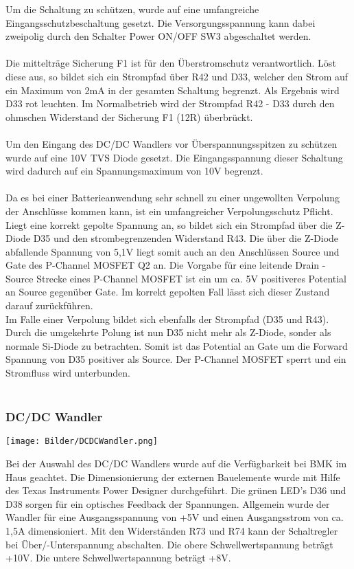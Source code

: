\documentclass[a4paper,11pt]{scrartcl}
\begin{document}
Um die Schaltung zu schützen, wurde auf eine umfangreiche Eingangsschutzbeschaltung gesetzt. Die Versorgungsspannung kann dabei zweipolig durch den Schalter \glqq Power ON/OFF SW3 \grqq{} abgeschaltet werden.
\\
\\
Die mittelträge Sicherung F1 ist für den Überstromschutz verantwortlich. Löst diese aus, so bildet sich ein Strompfad über R42 und D33, welcher den Strom auf ein Maximum von 2mA in der gesamten Schaltung begrenzt. Als Ergebnis wird D33 rot leuchten. Im Normalbetrieb wird der Strompfad R42 - D33 durch den ohmschen Widerstand der Sicherung F1 (12R) überbrückt.
\\
\\
Um den Eingang des DC/DC Wandlers vor Überspannungsspitzen zu schützen wurde auf eine 10V TVS Diode gesetzt. Die Eingangsspannung dieser Schaltung wird dadurch auf ein Spannungsmaximum von 10V begrenzt. 
\\
\\
Da es bei einer Batterieanwendung sehr schnell zu einer ungewollten Verpolung der Anschlüsse kommen kann, ist ein umfangreicher Verpolungsschutz Pflicht. Liegt eine korrekt gepolte Spannung an, so bildet sich ein Strompfad über die Z-Diode D35 und den strombegrenzenden Widerstand R43. Die über die Z-Diode abfallende Spannung von 5,1V liegt somit auch an den Anschlüssen \glqq Source und Gate \grqq{} des P-Channel MOSFET Q2 an. Die Vorgabe für eine leitende Drain - Source Strecke eines P-Channel MOSFET ist ein um ca. 5V positiveres Potential an Source gegenüber Gate. Im korrekt gepolten Fall lässt sich dieser Zustand darauf zurückführen.
\\ 
Im Falle einer Verpolung bildet sich ebenfalls der Strompfad (D35 und R43). Durch die umgekehrte Polung ist nun D35 nicht mehr als Z-Diode, sonder als normale Si-Diode zu betrachten. Somit ist das Potential an Gate um die \glqq Forward Spannung \grqq{} von D35 positiver als Source.  Der P-Channel MOSFET sperrt und ein Stromfluss wird unterbunden.
\\
\\
\subsubsection{DC/DC Wandler}

\begin{center}
\texttt{[image: Bilder/DCDCWandler.png]}
\end{center}

Bei der Auswahl des DC/DC Wandlers wurde auf die Verfügbarkeit bei BMK im Haus geachtet. Die Dimensionierung der externen Bauelemente wurde mit Hilfe des \glqq Texas Instruments Power Designer \grqq{} durchgeführt. Die grünen LED's D36 und D38 sorgen für ein optisches Feedback der Spannungen. Allgemein wurde der Wandler für eine Ausgangsspannung von +5V und einen Ausgangsstrom von ca. 1,5A dimensioniert. Mit den Widerständen R73 und R74 kann der Schaltregler bei Über/-Unterspannung abschalten. Die obere Schwellwertspannung beträgt +10V. Die untere Schwellwertspannung beträgt +8V.
\end{document}
